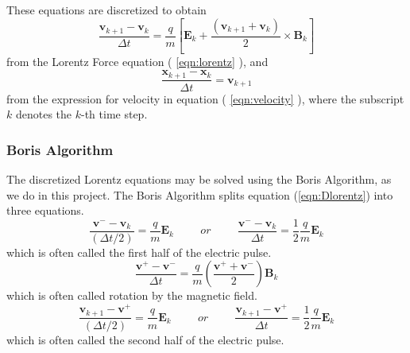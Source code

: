 \documentclass[12pt]{article}
\begin{document}
	\noindent These equations are discretized to obtain
	\begin{equation}
		\label{eqn:Dlorentz}
		\frac{\boldsymbol{v}_{k+1} - \boldsymbol{v}_{k}}{\Delta t} = \frac{q}{m} \left[\mathbf{E}_{k} + \frac{\left( \boldsymbol{v}_{k+1} + \boldsymbol{v}_{k} \right) }{2} \times \mathbf{B}_{k} \right] 
	\end{equation}
	from the Lorentz Force equation ( \ref{eqn:lorentz} ), and
	\begin{equation}
		\label{eqn:Dvelocity}
		\frac{\boldsymbol{x}_{k+1} - \boldsymbol{x}_{k} }{\Delta t} =	\boldsymbol{v}_{k+1}
	\end{equation}
	from the expression for velocity in equation ( \ref{eqn:velocity} ), where the subscript $k$ denotes the $k$-th time step.
	
	
	\subsubsection{Boris Algorithm}
	The discretized Lorentz equations may be solved using the Boris Algorithm, as we do in this project.
	The Boris Algorithm splits equation (\ref{eqn:Dlorentz}) into three equations.
	\begin{equation}
		\label{eqn:halfEpulse1}
		\frac{\boldsymbol{v}^{-} - \boldsymbol{v}_{k}}{\left( \Delta t  / 2 \right)} = \frac{q}{m} \mathbf{E}_{k} \hspace{1cm} or \hspace{1cm}	
		\frac{\boldsymbol{v}^{-} - \boldsymbol{v}_{k}}{ \Delta t } = \frac{1}{2}\frac{q}{m} \mathbf{E}_{k}
	\end{equation}
	which is often called the first half of the electric pulse.
	\begin{equation}
		\label{eqn:Brotation}
		\frac{\boldsymbol{v}^{+} - \boldsymbol{v}^{-}}{ \Delta t } = \frac{q}{m} \left(\frac{\boldsymbol{v}^{+} + \boldsymbol{v}^{-}}{ 2 }\right) \mathbf{B}_{k}
	\end{equation}
	which is often called rotation by the magnetic field.
	\begin{equation}
		\label{eqn:halfEpulse2}
		\frac{\boldsymbol{v}_{k+1} - \boldsymbol{v}^{+}}{\left( \Delta t  / 2 \right)} = \frac{q}{m} \mathbf{E}_{k} \hspace{1cm} or \hspace{1cm}	
		\frac{\boldsymbol{v}_{k+1} - \boldsymbol{v}^{+}}{ \Delta t } = \frac{1}{2}\frac{q}{m} \mathbf{E}_{k}
	\end{equation}
	which is often called the second half of the electric pulse.
	
\end{document}
